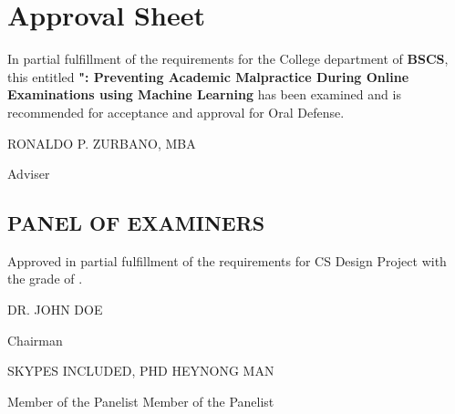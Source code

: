 \section*{\hfill Approval Sheet \hfill}

In partial fulfillment of the requirements for the College department of \textbf{BSCS}, this entitled \textbf{"\projectName: Preventing Academic Malpractice During Online Examinations using Machine Learning} has been examined and is recommended for acceptance and approval for Oral Defense.

\vspace{2em}

\begin{flushright}
    \uppercase{Ronaldo P. Zurbano, MBA}

    Adviser
\end{flushright}

\vspace{2em}

\subsection*{\centering PANEL OF EXAMINERS}

Approved in partial fulfillment of the requirements for CS Design Project with the grade of \makebox[1.0in]{\hrulefill}.

\vspace{2em}

\begin{center}
    \uppercase{Dr. John Doe}

    Chairman
\end{center}

\vspace{2em}

\noindent \uppercase{Skypes Included, PhD} \hfill \uppercase{Heynong Man}

\noindent Member of the Panelist \hfill Member of the Panelist

